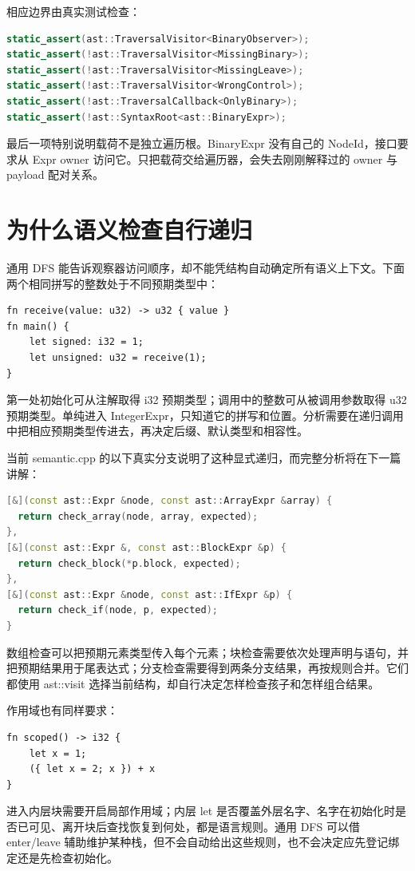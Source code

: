 相应边界由真实测试检查：
\begin{lstlisting}[language=C++]
static_assert(ast::TraversalVisitor<BinaryObserver>);
static_assert(!ast::TraversalVisitor<MissingBinary>);
static_assert(!ast::TraversalVisitor<MissingLeave>);
static_assert(!ast::TraversalVisitor<WrongControl>);
static_assert(!ast::TraversalCallback<OnlyBinary>);
static_assert(!ast::SyntaxRoot<ast::BinaryExpr>);
\end{lstlisting}
最后一项特别说明载荷不是独立遍历根。BinaryExpr 没有自己的 NodeId，接口要求从 Expr owner 访问它。只把载荷交给遍历器，会失去刚刚解释过的 owner 与 payload 配对关系。

\section{为什么语义检查自行递归}
通用 DFS 能告诉观察器访问顺序，却不能凭结构自动确定所有语义上下文。下面两个相同拼写的整数处于不同预期类型中：
\begin{lstlisting}[language=Rustless]
fn receive(value: u32) -> u32 { value }
fn main() {
    let signed: i32 = 1;
    let unsigned: u32 = receive(1);
}
\end{lstlisting}
第一处初始化可从注解取得 i32 预期类型；调用中的整数可从被调用参数取得 u32 预期类型。单纯进入 IntegerExpr，只知道它的拼写和位置。分析需要在递归调用中把相应预期类型传进去，再决定后缀、默认类型和相容性。

当前 semantic.cpp 的以下真实分支说明了这种显式递归，而完整分析将在下一篇讲解：
\begin{lstlisting}[language=C++]
[&](const ast::Expr &node, const ast::ArrayExpr &array) {
  return check_array(node, array, expected);
},
[&](const ast::Expr &, const ast::BlockExpr &p) {
  return check_block(*p.block, expected);
},
[&](const ast::Expr &node, const ast::IfExpr &p) {
  return check_if(node, p, expected);
}
\end{lstlisting}
数组检查可以把预期元素类型传入每个元素；块检查需要依次处理声明与语句，并把预期结果用于尾表达式；分支检查需要得到两条分支结果，再按规则合并。它们都使用 ast::visit 选择当前结构，却自行决定怎样检查孩子和怎样组合结果。

作用域也有同样要求：
\begin{lstlisting}[language=Rustless]
fn scoped() -> i32 {
    let x = 1;
    ({ let x = 2; x }) + x
}
\end{lstlisting}
进入内层块需要开启局部作用域；内层 let 是否覆盖外层名字、名字在初始化时是否已可见、离开块后查找恢复到何处，都是语言规则。通用 DFS 可以借 enter/leave 辅助维护某种栈，但不会自动给出这些规则，也不会决定应先登记绑定还是先检查初始化。

